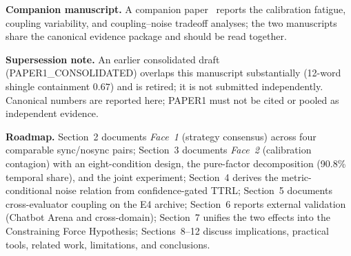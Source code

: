 \documentclass[11pt]{article}
\begin{document}
\noindent\textbf{Companion manuscript.} A companion paper~\citep{companioncal2026} reports the calibration fatigue, coupling variability, and coupling--noise tradeoff analyses; the two manuscripts share the canonical evidence package and should be read together.

\noindent\textbf{Supersession note.} An earlier consolidated draft (PAPER1\_CONSOLIDATED) overlaps this manuscript substantially (12-word shingle containment $0.67$) and is retired; it is not submitted independently. Canonical numbers are reported here; PAPER1 must not be cited or pooled as independent evidence.

\noindent\textbf{Roadmap.} Section~2 documents \textit{Face~1} (strategy consensus) across four comparable sync/nosync pairs; Section~3 documents \textit{Face~2} (calibration contagion) with an eight-condition design, the pure-factor decomposition (90.8\% temporal share), and the joint experiment; Section~4 derives the metric-conditional noise relation from confidence-gated TTRL; Section~5 documents cross-evaluator coupling on the E4 archive; Section~6 reports external validation (Chatbot Arena and cross-domain); Section~7 unifies the two effects into the Constraining Force Hypothesis; Sections~8--12 discuss implications, practical tools, related work, limitations, and conclusions.
\end{document}
